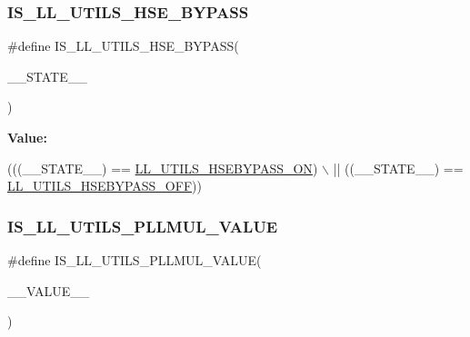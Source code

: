 \subsubsection{\texorpdfstring{I\+S\+\_\+\+L\+L\+\_\+\+U\+T\+I\+L\+S\+\_\+\+H\+S\+E\+\_\+\+B\+Y\+P\+A\+SS}{IS\_LL\_UTILS\_HSE\_BYPASS}}
{\footnotesize\ttfamily \#define I\+S\+\_\+\+L\+L\+\_\+\+U\+T\+I\+L\+S\+\_\+\+H\+S\+E\+\_\+\+B\+Y\+P\+A\+SS(\begin{DoxyParamCaption}\item[{}]{\+\_\+\+\_\+\+S\+T\+A\+T\+E\+\_\+\+\_\+ }\end{DoxyParamCaption})}

{\bfseries Value\+:}
\begin{DoxyCode}
(((\_\_STATE\_\_) == \hyperlink{group___u_t_i_l_s___e_c___h_s_e___b_y_p_a_s_s_ga2053b398a3829ad616af6f1a732dbdd4}{LL\_UTILS\_HSEBYPASS\_ON}) \(\backslash\)
                                        || ((\_\_STATE\_\_) == 
      \hyperlink{group___u_t_i_l_s___e_c___h_s_e___b_y_p_a_s_s_ga4aab0968739934c6560805bcf222e1fe}{LL\_UTILS\_HSEBYPASS\_OFF}))
\end{DoxyCode}
\mbox{\label{group___u_t_i_l_s___l_l___private___macros_ga5043a539f543f86fcae20cd891805dfd}} 
\subsubsection{\texorpdfstring{I\+S\+\_\+\+L\+L\+\_\+\+U\+T\+I\+L\+S\+\_\+\+P\+L\+L\+M\+U\+L\+\_\+\+V\+A\+L\+UE}{IS\_LL\_UTILS\_PLLMUL\_VALUE}}
{\footnotesize\ttfamily \#define I\+S\+\_\+\+L\+L\+\_\+\+U\+T\+I\+L\+S\+\_\+\+P\+L\+L\+M\+U\+L\+\_\+\+V\+A\+L\+UE(\begin{DoxyParamCaption}\item[{}]{\+\_\+\+\_\+\+V\+A\+L\+U\+E\+\_\+\+\_\+ }\end{DoxyParamCaption})}

